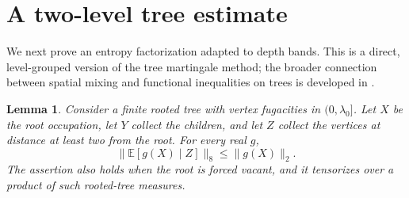 \documentclass[11pt,reqno]{amsart}
\newtheorem{lemma}[theorem]{Lemma}
\theoremstyle{remark}
\newcommand{\E}{\mathbb E}
\numberwithin{equation}{section}
\begin{document}
\section{A two-level tree estimate}

We next prove an entropy factorization adapted to depth bands. This is a direct, level-grouped version of the tree martingale method; the broader connection between spatial mixing and functional inequalities on trees is developed in \cite{MSW}.

\begin{lemma}\label{lem:hyper}
Consider a finite rooted tree with vertex fugacities in $(0,\lambda_0]$. Let $X$ be the root occupation, let $Y$ collect the children, and let $Z$ collect the vertices at distance at least two from the root. For every real $g$,
\begin{equation}\label{eq:hyper}
 \bigl\|\E[g(X)\mid Z]\bigr\|_8\le\|g(X)\|_2.
\end{equation}
The assertion also holds when the root is forced vacant, and it tensorizes over a product of such rooted-tree measures.
\end{lemma}
\end{document}
